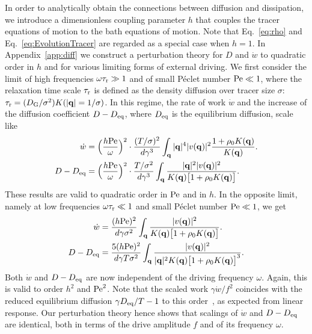 \documentclass[pre, superscriptaddress, twocolumn,pre]{revtex4-1}
\begin{document}
In order to analytically obtain the connections between diffusion and dissipation, we introduce a dimensionless coupling parameter $h$ that couples the tracer equations of motion to the bath equations of motion. Note that Eq.~\ref{eq:rho} and Eq.~\ref{eq:EvolutionTracer} are regarded as a special case when $h=1$. In Appendix~\ref{app:diff} we construct a perturbation theory for $D$ and $\dot w$ to quadratic order in $h$ and for various limiting forms of external driving. 
We first consider the limit of high frequencies $\omega\tau_{\rm r}\gg 1$ and of small P\'eclet number ${\rm Pe}\ll 1$, where the relaxation time scale $\tau_{\rm r}$ is defined as the density diffusion over tracer size $\sigma$: $\tau_{\rm r}=(D_{\rm G}/\sigma^2)K(|{\bf q}|=1/\sigma)$.
In this regime, the rate of work $\dot w$ and the increase of the diffusion coefficient $D-D_{\rm eq}$, where $D_{\rm eq}$ is the equilibrium diffusion, scale like
\begin{equation}\label{eq:small}
	\begin{aligned}
		\dot w &= \Big(\frac{h{\rm Pe}}{\omega}\Big)^2 \cdot \frac{(T/\sigma)^2}{d\gamma^3} \int_{\bf q} |{\bf q}|^4 |v({\bf q})|^2 \frac{1 + \rho_0K({\bf q})}{K({\bf q})} .
		\\
		D-D_{\rm eq} &= \Big(\frac{h{\rm Pe}}{\omega}\Big)^2 \cdot \frac{T /\sigma^2}{d\gamma^3} \int_{\bf q}\frac{|{\bf q}|^2 |v({\bf q})|^2 } {K({\bf q})\big[1 + \rho_0 K({\bf q})\big]} .
	\end{aligned}
\end{equation}
These results are valid to quadratic order in $\rm Pe$ and in $h$. In the opposite limit, namely at low frequencies $\omega\tau_{\rm r}\ll 1$ and small P\'eclet number ${\rm Pe}\ll1$, we get
\begin{equation}\label{eq:large}
	\begin{aligned}
		\dot w &=  \frac{(h{\rm Pe})^2}{d\gamma\sigma^2} \int_{\bf q} \frac{|v({\bf q})|^2}{K({\bf q})\big[1 + \rho_0K({\bf q})\big]} .
		\\
		D - D_{\rm eq} &= \frac{5(h{\rm Pe})^2}{d\gamma T\sigma^2} \int_{\bf q} \frac{|v({\bf q})|^2}{|{\bf q}|^2K({\bf q})\big[1 + \rho_0K({\bf q})\big]^3} .
	\end{aligned}
\end{equation}
Both $\dot w$ and $D-D_{\rm eq}$ are now independent of the driving frequency $\omega$. Again, this is valid to order $h^2$ and ${\rm Pe}^2$. Note that the scaled work $\gamma\dot w/f^2$ coincides with the reduced equilibrium diffusion $\gamma D_{\rm eq}/T-1$ to this order~\cite{Demery2011, Demery2014}, as expected from linear response. Our perturbation theory hence shows that scalings of $\dot w$ and $D-D_{\rm eq}$ are identical, both in terms of the drive amplitude $f$ and of its frequency $\omega$.
\end{document}
